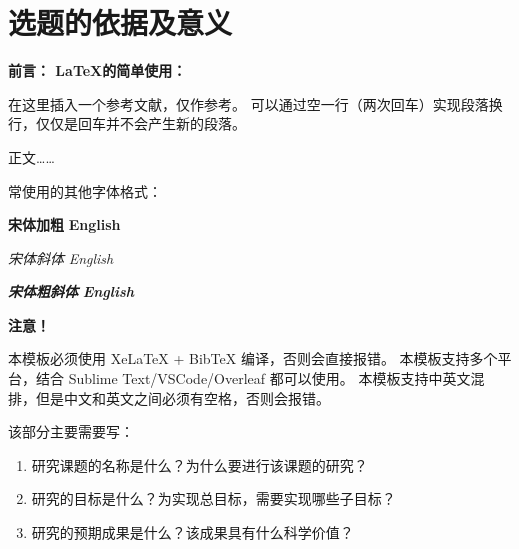 %
%
%
%

\section{选题的依据及意义}

\textbf{前言： \LaTeX 的简单使用：}

在这里插入一个参考文献，仅作参考\cite{yuFeiJiZongTiDuoXueKeSheJiYouHuaDeXianZhuangYuFaZhanFangXiang2008}。
可以通过空一行（两次回车）实现段落换行，仅仅是回车并不会产生新的段落。

正文……\cite{simonyanVeryDeepConvolutional2015}

常使用的其他字体格式：

{\songti \bfseries 宋体加粗} {\textbf{English}}

{\songti \itshape 宋体斜体} {\textit{English}}

{\songti \bfseries \itshape 宋体粗斜体} {\textbf{\textit{English}}}

\textbf{注意！}

本模板必须使用 XeLaTeX + BibTeX 编译，否则会直接报错。
本模板支持多个平台，结合 Sublime Text/VSCode/Overleaf 都可以使用。
本模板支持中英文混排，但是中文和英文之间必须有空格，否则会报错。

\vspace{10mm}

该部分主要需要写：
\begin{enumerate}[label=\arabic*)]
    \item 研究课题的名称是什么？为什么要进行该课题的研究？
    \item 研究的目标是什么？为实现总目标，需要实现哪些子目标？
    \item 研究的预期成果是什么？该成果具有什么科学价值？
\end{enumerate}
